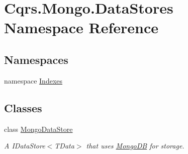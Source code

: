 \hypertarget{namespaceCqrs_1_1Mongo_1_1DataStores}{}\section{Cqrs.\+Mongo.\+Data\+Stores Namespace Reference}
\label{namespaceCqrs_1_1Mongo_1_1DataStores}
\subsection*{Namespaces}
\begin{DoxyCompactItemize}
\item 
namespace \hyperlink{namespaceCqrs_1_1Mongo_1_1DataStores_1_1Indexes}{Indexes}
\end{DoxyCompactItemize}
\subsection*{Classes}
\begin{DoxyCompactItemize}
\item 
class \hyperlink{classCqrs_1_1Mongo_1_1DataStores_1_1MongoDataStore}{Mongo\+Data\+Store}
\begin{DoxyCompactList}\small\item\em A I\+Data\+Store$<$\+T\+Data$>$ that uses \hyperlink{namespaceCqrs_1_1MongoDB}{Mongo\+DB} for storage. \end{DoxyCompactList}\end{DoxyCompactItemize}
